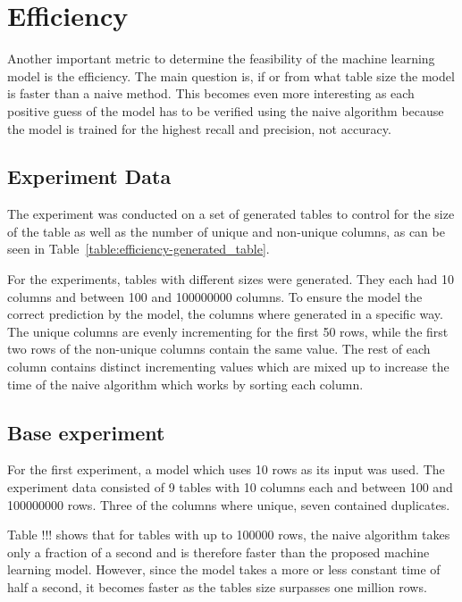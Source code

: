 \section{Efficiency}\label{sec:efficiency}
Another important metric to determine the feasibility of the machine learning model is the efficiency. The main question is, if or from what table size the model is faster than a naive method. This becomes even more interesting as each positive guess of the model has to be verified using the naive algorithm because the model is trained for the highest recall and precision, not accuracy. %


\subsection{Experiment Data}\label{subsec:efficiency-experiment_data}
The experiment was conducted on a set of generated tables to control for the size of the table as well as the number of unique and non-unique columns, as can be seen in Table~\ref{table:efficiency-generated_table}.

For the experiments, tables with different sizes were generated. They each had \num{10} columns and between \num{100} and \num{100000000} columns. To ensure the model the correct prediction by the model, the columns where generated in a specific way. The unique columns are evenly incrementing for the first \num{50} rows, while the first two rows of the non-unique columns contain the same value. The rest of each column contains distinct incrementing values which are mixed up to increase the time of the naive algorithm which works by sorting each column.




\subsection{Base experiment}\label{subsec:efficiency-base_experiment}
For the first experiment, a model which uses 10 rows as its input was used. The experiment data consisted of \num{9} tables with \num{10} columns each and between \num{100} and \num{100000000} rows. Three of the columns where unique, seven contained duplicates.

Table !!! shows that for tables with up to \num{100000} rows, the naive algorithm takes only a fraction of a second and is therefore faster than the proposed machine learning model. However, since the model takes a more or less constant time of half a second, it becomes faster as the tables size surpasses one million rows.


